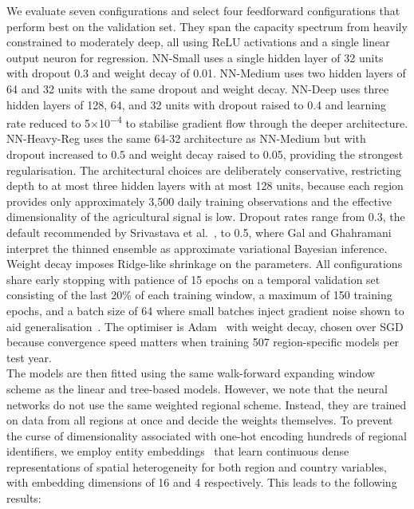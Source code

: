 \documentclass[pdflatex,sn-mathphys-num, oneside, 11pt]{sn-jnl}%
\theoremstyle{thmstyleone}%
\theoremstyle{thmstyletwo}%
\theoremstyle{thmstylethree}%
\begin{document}
We evaluate seven configurations and select four feedforward configurations that perform best on the validation set. They span the capacity spectrum from heavily constrained to moderately deep, all using ReLU activations and a single linear output neuron for regression. NN-Small uses a single hidden layer of 32 units with dropout 0.3 and weight decay of 0.01. NN-Medium uses two hidden layers of 64 and 32 units with the same dropout and weight decay. NN-Deep uses three hidden layers of 128, 64, and 32 units with dropout raised to 0.4 and learning rate reduced to 5$\times$10\textsuperscript{$-$4} to stabilise gradient flow through the deeper architecture. NN-Heavy-Reg uses the same 64-32 architecture as NN-Medium but with dropout increased to 0.5 and weight decay raised to 0.05, providing the strongest regularisation. The architectural choices are deliberately conservative, restricting depth to at most three hidden layers with at most 128 units, because each region provides only approximately 3,500 daily training observations and the effective dimensionality of the agricultural signal is low. Dropout rates range from 0.3, the default recommended by Srivastava et al.~\cite{bib_srivastava}, to 0.5, where Gal and Ghahramani~\cite{bib_gal} interpret the thinned ensemble as approximate variational Bayesian inference. Weight decay imposes Ridge-like shrinkage on the parameters. All configurations share early stopping with patience of 15 epochs on a temporal validation set consisting of the last 20\% of each training window, a maximum of 150 training epochs, and a batch size of 64 where small batches inject gradient noise shown to aid generalisation~\cite{bib_wilson}. The optimiser is Adam~\cite{bib_kingma} with weight decay, chosen over SGD because convergence speed matters when training 507 region-specific models per test year.\\

The models are then fitted using the same walk-forward expanding window scheme as the linear and tree-based models. However, we note that the neural networks do not use the same weighted regional scheme. Instead, they are trained on data from all regions at once and decide the weights themselves. To prevent the curse of dimensionality associated with one-hot encoding hundreds of regional identifiers, we employ entity embeddings~\cite{bib_guo} that learn continuous dense representations of spatial heterogeneity for both region and country variables, with embedding dimensions of 16 and 4 respectively. This leads to the following results:
\end{document}
